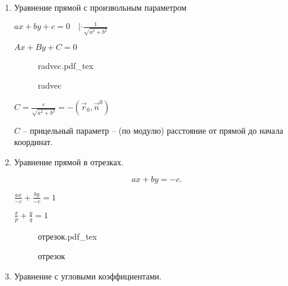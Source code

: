 \documentclass{book}
\newcommand{\p}[1]{#1^{\prime}}
\newcommand{\pp}[1]{#1^{\prime\prime}}
\theoremstyle{definition}
\newtheorem*{example}{Пример}
\newcommand{\incfig}[1]{%
    \def\svgwidth{\columnwidth}
    {#1.pdf_tex}
}
\begin{document}
\begin{enumerate}
\begin{enumerate}
        $\begin{cases}
            x = x_0+\alpha t\\
            y = y_0+\beta t\\
        \end{cases}$ -- параметрическое уравнение прямой.
    \item $\frac{x-x_0}{\alpha} = \frac{y-y_0}{\beta}$ -- каноническое уравнение прямой.
\end{enumerate}
\begin{example}
    $l:\quad2x+3y-1=0$ Рассмотрим  $A(1,1)$, которая не лежит на прямой

    $\p l:\quad2(x-1) + 3(y-1) = 0$ -- уравнение прямой, проходящей через  $A$ параллельно  $\ell$

    $\pp l:\quad \frac{x-1}{2} = \frac{y-1}{3}$ -- уравнение прямой, проходящей через $A$ перпендикулярно  $\ell $ (её направляющая -- нормаль изначальной)
\end{example}
\begin{example}
    $\frac{x-5}{2} = \frac{y-1}{4}\quad A(1,1)$ 

    $\p l:\quad \frac{x-1}{2} = \frac{y-1}{4}$

    $\pp l: 2(x-1) + 4(y-1) = 0$
\end{example}
\item Уравнение прямой с произвольным параметром

    $ax+by+c=0\quad | \cdot \frac{1}{\sqrt{a^2+b^2} }$ 

    $Ax+By+C=0$

\begin{figure}[ht]
    \centering
    \incfig{radvec}
    \caption{radvec}
    \label{fig:radvec}
\end{figure}

$C = \frac{c}{\sqrt{a^2+b^2} } = -(\vec r_0, \vec n^0)$

$C$ -- прицельный параметр -- (по модулю) расстояние от прямой до начала координат.
\item Уравнение прямой в отрезках.

     \[
    ax+by=-c
    .\] 

    $\frac{ax}{-c} + \frac{by}{-c} = 1$ 

    $\frac{x}{p} + \frac{y}{q} = 1$ 

\begin{figure}[ht]
    \centering
    \incfig{отрезок}
    \caption{отрезок}
    \label{fig:отрезок}
\end{figure}
\item Уравнение с угловыми коэффициентами.


\end{enumerate}
\end{document}
